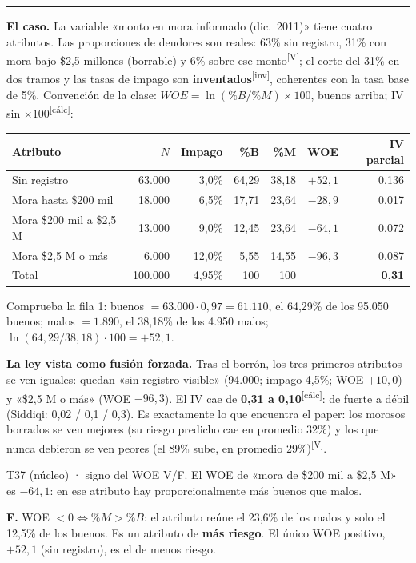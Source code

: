 \documentclass[10pt,a4paper]{article}
\newcommand{\V}{\textsuperscript{\textcolor{green!45!black}{[V]}}}
\newcommand{\inv}{\textsuperscript{\textcolor{red!60!black}{[inv]}}}
\newcommand{\calc}{\textsuperscript{\textcolor{blue!60!black}{[cálc]}}}
\newcommand{\acto}[1]{\vspace{6pt}{\large\bfseries #1}\par\vspace{2pt}\hrule\vspace{4pt}}
\begin{document}
\acto{Acto 3. El score con y sin Dicom: WOE e IV}

\textbf{El caso.} La variable «monto en mora informado (dic.\ 2011)» tiene cuatro atributos. Las proporciones de deudores son reales: 63\% sin registro, 31\% con mora bajo \$2,5 millones (borrable) y 6\% sobre ese monto\V; el corte del 31\% en dos tramos y las tasas de impago son \textbf{inventados}\inv, coherentes con la tasa base de 5\%. Convención de la clase: $WOE=\ln(\%B/\%M)\times100$, buenos arriba; IV sin $\times100$\calc:
\begin{center}\small
\renewcommand{\arraystretch}{1.15}
\begin{tabular}{lrrrrrr}\toprule
Atributo & $N$ & Impago & \%B & \%M & WOE & IV parcial\\\midrule
Sin registro & 63.000 & 3,0\% & 64,29 & 38,18 & $+52{,}1$ & 0,136\\
Mora hasta \$200 mil & 18.000 & 6,5\% & 17,71 & 23,64 & $-28{,}9$ & 0,017\\
Mora \$200 mil a \$2,5 M & 13.000 & 9,0\% & 12,45 & 23,64 & $-64{,}1$ & 0,072\\
Mora \$2,5 M o más & 6.000 & 12,0\% & 5,55 & 14,55 & $-96{,}3$ & 0,087\\\midrule
Total & 100.000 & 4,95\% & 100 & 100 & & \textbf{0,31}\\\bottomrule
\end{tabular}
\end{center}
Comprueba la fila 1: buenos $=63.000\cdot0{,}97=61.110$, el 64,29\% de los 95.050 buenos; malos $=1.890$, el 38,18\% de los 4.950 malos; $\ln(64{,}29/38{,}18)\cdot100=+52{,}1$.

\textbf{La ley vista como fusión forzada.} Tras el borrón, los tres primeros atributos se ven iguales: quedan «sin registro visible» (94.000; impago 4,5\%; WOE $+10{,}0$) y «\$2,5 M o más» (WOE $-96{,}3$). El IV cae de \textbf{0,31 a 0,10}\calc: de fuerte a débil (Siddiqi: 0,02 / 0,1 / 0,3). Es exactamente lo que encuentra el paper: los morosos borrados se ven mejores (su riesgo predicho cae en promedio 32\%) y los que nunca debieron se ven peores (el 89\% sube, en promedio 29\%)\V.

\begin{enun}{T37 (núcleo) · signo del WOE}
V/F. El WOE de «mora de \$200 mil a \$2,5 M» es $-64{,}1$: en ese atributo hay proporcionalmente más buenos que malos.
\end{enun}
\begin{ejemplar}
\textbf{F.} WOE $<0\iff\%M>\%B$: el atributo reúne el 23,6\% de los malos y solo el 12,5\% de los buenos. Es un atributo de \textbf{más riesgo}. El único WOE positivo, $+52{,}1$ (sin registro), es el de menos riesgo.
\end{ejemplar}
\end{document}

